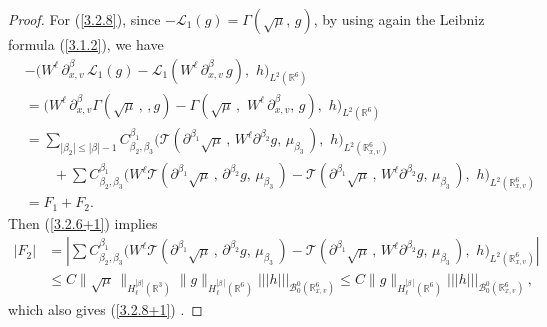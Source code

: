 \documentclass{amsart}[12pt, article]
\begin{document}
\begin{proof}
For (\ref{3.2.8}), since $-{{\mathcal L}}_1(g)=\Gamma(\sqrt\mu,\, g)$, by using
again the Leibniz formula (\ref{3.1.2}), we have
\begin{align*}
&-\Big(W^\ell \,\partial^\beta_{x, v}\,{{\mathcal L}}_1( g)-
{{\mathcal L}}_1(W^\ell \,\partial^\beta_{x, v}\,g),\,\, h\Big)_{L^2({{{\mathbb R}}}^6)}\\
&=\Big(W^\ell \,\partial^\beta_{x, v} \Gamma(\sqrt\mu\,,\,
,g)-\Gamma(\sqrt\mu\,,\,\,W^\ell \,\partial^\beta_{x, v},\, g),\,\,
h\Big)_{L^2({{{\mathbb R}}}^6)}\\
&= \sum_{|\beta_2|\leq |\beta|-1} C^{\beta_1}_{\beta_2, \beta_3}
\Big({{\mathcal T}}(\partial^{\beta_1} \sqrt\mu\,,\, W^\ell \partial^{\beta_2}
g,\,
\mu_{\beta_3}\,) ,\,\, h\Big)_{L^2({{{\mathbb R}}}^6_{x, v})}\\
&\qquad+\sum C^{\beta_1}_{\beta_2, \beta_3}
\Big(W^\ell{{\mathcal T}}(\partial^{\beta_1} \sqrt\mu\,,\, \partial^{\beta_2}
g,\, \mu_{\beta_3}\,) - {{\mathcal T}}(\partial^{\beta_1} \sqrt\mu\,,\, W^\ell
\partial^{\beta_2} g,\, \mu_{\beta_3}\,) ,\,\,
h\Big)_{L^2({{{\mathbb R}}}^6_{x, v})}\\
&=F_1+F_2.
\end{align*}
Then (\ref{3.2.6+1}) implies
\begin{align*}
|F_2|&= \left|\sum C^{\beta_1}_{\beta_2,
\beta_3}\Big(W^\ell{{\mathcal T}}(\partial^{\beta_1} \sqrt\mu\,,\,
\partial^{\beta_2} g,\, \mu_{\beta_3}\,)
- {{\mathcal T}}(\partial^{\beta_1}\sqrt\mu\,,\, W^\ell
\partial^{\beta_2} g,\, \mu_{\beta_3}\,)
,\,\, h\Big)_{L^2({{{\mathbb R}}}^6_{x, v})}\right|\\
&\leq C
\|\sqrt\mu\,\|_{H^{|\beta|}_\ell({{{\mathbb R}}}^3)}\|g\|_{H^{|\beta\,|}_\ell({{{\mathbb R}}}^6)}
|||h|||_{{{\mathcal B}}^0_0({{{\mathbb R}}}^6_{x, v})} \leq C
\|g\|_{H^{|\beta\,|}_\ell({{{\mathbb R}}}^6)}|||h|||_{{{\mathcal B}}^0_0({{{\mathbb R}}}^6_{x, v})}\, ,
\end{align*}
which also gives (\ref{3.2.8+1}) .


\end{proof}
\end{document}
